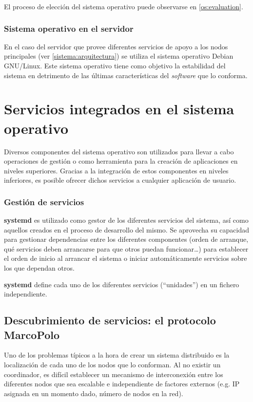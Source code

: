 El proceso de elección del sistema operativo puede observarse en \ref{os:evaluation}.


\subsubsection{Sistema operativo en el servidor}

En el caso del servidor que provee diferentes servicios de apoyo a los nodos principales (ver \ref{sistema:arquitectura}) se utiliza el sistema operativo Debian GNU/Linux. Este sistema operativo tiene como objetivo la estabilidad del sistema en detrimento de las últimas características del \textit{software} que lo conforma.

\section{Servicios integrados en el sistema operativo}

Diversos componentes del sistema operativo son utilizados para llevar a cabo operaciones de gestión o como herramienta para la creación de aplicaciones en niveles superiores. Gracias a la integración de estos componentes en niveles inferiores, es posible ofrecer dichos servicios a cualquier aplicación de usuario. 


\subsubsection{Gestión de servicios}

\textbf{systemd} es utilizado como gestor de los diferentes servicios del sistema, así como aquellos creados en el proceso de desarrollo del mismo. Se aprovecha su capacidad para gestionar dependencias entre los diferentes componentes (orden de arranque, qué servicios deben arrancarse para que otros puedan funcionar\dots) para establecer el orden de inicio al arrancar el sistema o iniciar automáticamente servicios sobre los que dependan otros.

\textbf{systemd} define cada uno de los diferentes servicios (``unidades'') en un fichero independiente.

\subsection{Descubrimiento de servicios: el protocolo MarcoPolo}

Uno de los problemas típicos a la hora de crear un sistema distribuido es la localización de cada uno de los nodos que lo conforman. Al no existir un coordinador, es difícil establecer un mecanismo de interconexión entre los diferentes nodos que sea escalable e independiente de factores externos (e.g. IP asignada en un momento dado, número de nodos en la red).



